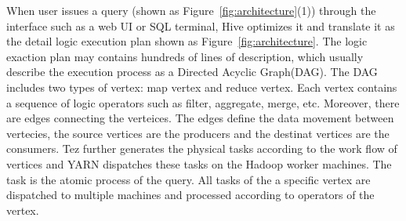When user issues a query (shown as Figure~\ref{fig:architecture}(1)) through the interface such as a web UI or SQL terminal, Hive optimizes it and translate it as the detail logic execution plan shown as Figure~\ref{fig:architecture}. The logic exaction plan may contains hundreds of lines of description, which usually describe the execution process as a Directed Acyclic Graph(DAG). The DAG includes two types of vertex: map vertex and reduce vertex. Each vertex contains a sequence of logic operators such as filter, aggregate, merge, etc. Moreover, there are edges connecting the verteices. The edges define the data movement between vertecies, the source vertices are the producers and the destinat vertices are the consumers.
Tez further generates the physical tasks according to the work flow of vertices and YARN dispatches these tasks on the Hadoop worker machines.  The task is the atomic process of the query. All tasks of the a specific vertex are dispatched to multiple machines and processed according to operators of the vertex.  